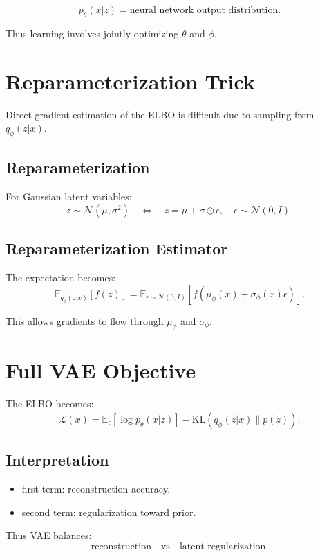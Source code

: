 \[
p_\theta(x|z) = \text{neural network output distribution}.
\]

Thus learning involves jointly optimizing $\theta$ and $\phi$.

\section{Reparameterization Trick}

Direct gradient estimation of the ELBO is difficult due to sampling from $q_\phi(z|x)$.

\subsection{Reparameterization}

For Gaussian latent variables:
\[
z \sim \mathcal{N}(\mu, \sigma^2)
\quad \Longleftrightarrow \quad
z = \mu + \sigma \odot \epsilon,\quad \epsilon \sim \mathcal{N}(0,I).
\]

\subsection{Reparameterization Estimator}

The expectation becomes:
\[
\mathbb{E}_{q_\phi(z|x)}[f(z)]
=
\mathbb{E}_{\epsilon \sim \mathcal{N}(0,I)}[f(\mu_\phi(x) + \sigma_\phi(x)\epsilon)].
\]

This allows gradients to flow through $\mu_\phi$ and $\sigma_\phi$.

\section{Full VAE Objective}

The ELBO becomes:
\[
\mathcal{L}(x)
=
\mathbb{E}_{\epsilon}\left[\log p_\theta(x|z)\right]
-
\mathrm{KL}(q_\phi(z|x)\|p(z)).
\]

\subsection{Interpretation}

\begin{itemize}
    \item first term: reconstruction accuracy,
    \item second term: regularization toward prior.
\end{itemize}

Thus VAE balances:
\[
\text{reconstruction} \quad \text{vs} \quad \text{latent regularization}.
\]

